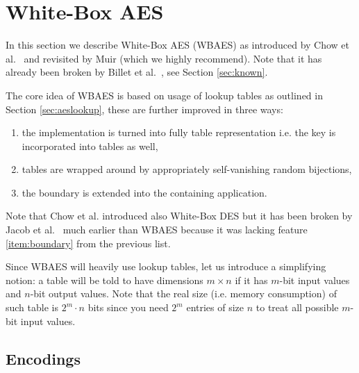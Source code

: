 \section{White-Box AES}
\label{sec:wbaes}

In this section we describe White-Box AES (WBAES) as introduced by Chow et al.\ \cite{chow2003aes} and revisited by Muir \cite{muir2013tutorial} (which we highly recommend). Note that it has already been broken by Billet et al.\ \cite{billet2005cryptanalysis}, see Section \ref{sec:known}.

The core idea of WBAES is based on usage of lookup tables as outlined in Section \ref{sec:aeslookup}, these are further improved in three ways:
\begin{enumerate}
	\item the implementation is turned into fully table representation i.e. the key is incorporated into tables as well,
	\item tables are wrapped around by appropriately self-vanishing random bijections, \label{item:wrap}
	\item the boundary is extended into the containing application. \label{item:boundary}
\end{enumerate}
Note that Chow et al. introduced also White-Box DES \cite{chow2003des} but it has been broken by Jacob et al.\ \cite{jacob2002attacking} much earlier than WBAES because it was lacking feature \ref{item:boundary} from the previous list.

\begin{notion}
\label{notion:table}
	Since WBAES will heavily use lookup tables, let us introduce a simplifying notion: a table will be told to have dimensions $m\times n$ if it has $m$-bit input values and $n$-bit output values. Note that the real size (i.e. memory consumption) of such table is $2^m\cdot n$ bits since you need $2^m$ entries of size $n$ to treat all possible $m$-bit input values.
\end{notion}



\subsection{Encodings}
\label{sec:encod}

